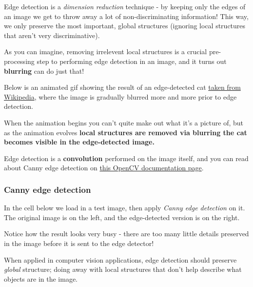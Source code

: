 \documentclass[11pt]{article}
\begin{document}
Edge detection is a \emph{dimension reduction} technique - by keeping
only the edges of an image we get to throw away a lot of
non-discriminating information! This way, we only preserve the most
important, global structures (ignoring local structures that aren't very
discriminative).

As you can imagine, removing irrelevent local structures is a crucial
pre-processing step to performing edge detection in an image, and it
turns out \textbf{blurring} can do just that!

Below is an animated gif showing the result of an edge-detected cat
\href{https://en.wikipedia.org/wiki/Gaussian_blur\#Common_uses}{taken
from Wikipedia}, where the image is gradually blurred more and more
prior to edge detection.

When the animation begins you can't quite make out what it's a picture
of, but as the animation evolves \textbf{local structures are removed
via blurring the cat becomes visible in the edge-detected image.}

Edge detection is a \textbf{convolution} performed on the image itself,
and you can read about Canny edge detection on
\href{http://docs.opencv.org/2.4/doc/tutorials/imgproc/imgtrans/canny_detector/canny_detector.html}{this
OpenCV documentation page}.

    \subsubsection{Canny edge detection}\label{canny-edge-detection}

In the cell below we load in a test image, then apply \emph{Canny edge
detection} on it. The original image is on the left, and the
edge-detected version is on the right.

Notice how the result looks very busy - there are too many little
details preserved in the image before it is sent to the edge detector!

When applied in computer vision applications, edge detection should
preserve \emph{global} structure; doing away with local structures that
don't help describe what objects are in the image.
\end{document}
